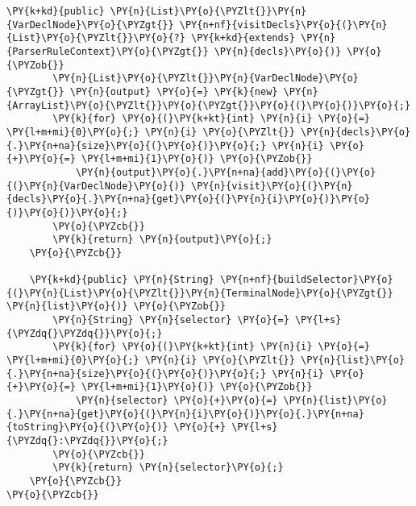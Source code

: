\begin{Verbatim}[commandchars=\\\{\}]
    \PY{k+kd}{public} \PY{n}{List}\PY{o}{\PYZlt{}}\PY{n}{VarDeclNode}\PY{o}{\PYZgt{}} \PY{n+nf}{visitDecls}\PY{o}{(}\PY{n}{List}\PY{o}{\PYZlt{}}\PY{o}{?} \PY{k+kd}{extends} \PY{n}{ParserRuleContext}\PY{o}{\PYZgt{}} \PY{n}{decls}\PY{o}{)} \PY{o}{\PYZob{}}
        \PY{n}{List}\PY{o}{\PYZlt{}}\PY{n}{VarDeclNode}\PY{o}{\PYZgt{}} \PY{n}{output} \PY{o}{=} \PY{k}{new} \PY{n}{ArrayList}\PY{o}{\PYZlt{}}\PY{o}{\PYZgt{}}\PY{o}{(}\PY{o}{)}\PY{o}{;}
        \PY{k}{for} \PY{o}{(}\PY{k+kt}{int} \PY{n}{i} \PY{o}{=} \PY{l+m+mi}{0}\PY{o}{;} \PY{n}{i} \PY{o}{\PYZlt{}} \PY{n}{decls}\PY{o}{.}\PY{n+na}{size}\PY{o}{(}\PY{o}{)}\PY{o}{;} \PY{n}{i} \PY{o}{+}\PY{o}{=} \PY{l+m+mi}{1}\PY{o}{)} \PY{o}{\PYZob{}}
            \PY{n}{output}\PY{o}{.}\PY{n+na}{add}\PY{o}{(}\PY{o}{(}\PY{n}{VarDeclNode}\PY{o}{)} \PY{n}{visit}\PY{o}{(}\PY{n}{decls}\PY{o}{.}\PY{n+na}{get}\PY{o}{(}\PY{n}{i}\PY{o}{)}\PY{o}{)}\PY{o}{)}\PY{o}{;}
        \PY{o}{\PYZcb{}}
        \PY{k}{return} \PY{n}{output}\PY{o}{;}
    \PY{o}{\PYZcb{}}
    
    \PY{k+kd}{public} \PY{n}{String} \PY{n+nf}{buildSelector}\PY{o}{(}\PY{n}{List}\PY{o}{\PYZlt{}}\PY{n}{TerminalNode}\PY{o}{\PYZgt{}} \PY{n}{list}\PY{o}{)} \PY{o}{\PYZob{}}
        \PY{n}{String} \PY{n}{selector} \PY{o}{=} \PY{l+s}{\PYZdq{}\PYZdq{}}\PY{o}{;}
        \PY{k}{for} \PY{o}{(}\PY{k+kt}{int} \PY{n}{i} \PY{o}{=} \PY{l+m+mi}{0}\PY{o}{;} \PY{n}{i} \PY{o}{\PYZlt{}} \PY{n}{list}\PY{o}{.}\PY{n+na}{size}\PY{o}{(}\PY{o}{)}\PY{o}{;} \PY{n}{i} \PY{o}{+}\PY{o}{=} \PY{l+m+mi}{1}\PY{o}{)} \PY{o}{\PYZob{}}
            \PY{n}{selector} \PY{o}{+}\PY{o}{=} \PY{n}{list}\PY{o}{.}\PY{n+na}{get}\PY{o}{(}\PY{n}{i}\PY{o}{)}\PY{o}{.}\PY{n+na}{toString}\PY{o}{(}\PY{o}{)} \PY{o}{+} \PY{l+s}{\PYZdq{}:\PYZdq{}}\PY{o}{;}
        \PY{o}{\PYZcb{}}
        \PY{k}{return} \PY{n}{selector}\PY{o}{;}
    \PY{o}{\PYZcb{}}
\PY{o}{\PYZcb{}}
\end{Verbatim}
